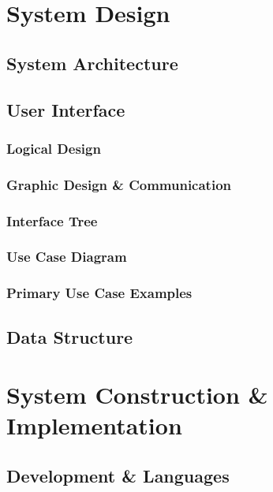 \documentclass[11pt, english]{article}
\begin{document}
\newpage

\section{System Design}\label{ch5}

	\subsection{System Architecture}

	\subsection{User Interface}

		\subsubsection{Logical Design}

		\subsubsection{Graphic Design \& Communication}

		\subsubsection{Interface Tree}

		\subsubsection{Use Case Diagram}

		\subsubsection{Primary Use Case Examples}

	\subsection{Data Structure}

\newpage

\section{System Construction \& Implementation}\label{ch6}

	\subsection{Development \& Languages}
\end{document}
